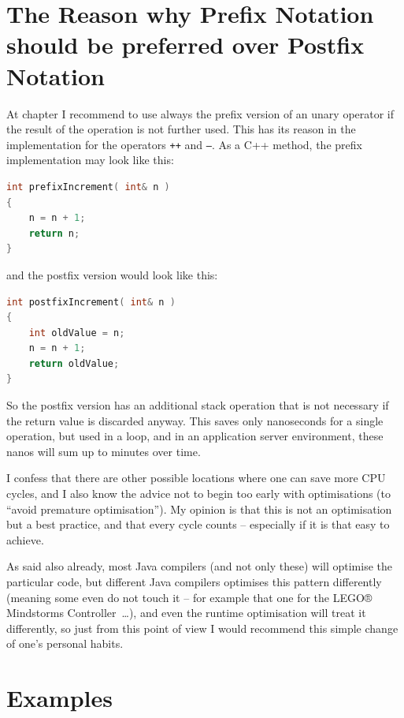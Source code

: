 \section{The Reason why Prefix Notation should be preferred over Postfix Notation}
At chapter  I recommend to use always the prefix version of an unary operator if the result of the operation is not further used. This has its reason in the implementation for the operators \texttt{++} and \texttt{--}. As a \mbox{C++} method, the prefix implementation may look like this:
\begin{lstlisting}[language=C++]
int prefixIncrement( int& n )
{
    n = n + 1;
    return n;
}
\end{lstlisting}
and the postfix version would look like this:
\begin{lstlisting}[language=C++]
int postfixIncrement( int& n )
{
    int oldValue = n;
    n = n + 1;
    return oldValue;
}
\end{lstlisting}
So the postfix version has an additional stack operation that is not necessary if the return value is discarded anyway. This saves only nanoseconds for a single operation, but used in a loop, and in an application server environment, these nanos will sum up to minutes over time.

I confess that there are other possible locations where one can save more CPU cycles, and I also know the advice not to begin too early with optimisations (to “avoid premature optimisation”). My opinion is that this is not an optimisation but a best practice, and that every cycle counts – especially if it is that easy to achieve.

As said also already, most Java compilers (and not only these) will optimise the particular code, but different Java compilers optimises this pattern differently (meaning some even do not touch it – for example that one for the LEGO® Mindstorms Controller~…), and even the runtime optimisation will treat it differently, so just from this point of view I would recommend this simple change of one's personal habits.


\section{Examples}\label{sec:Examples}



